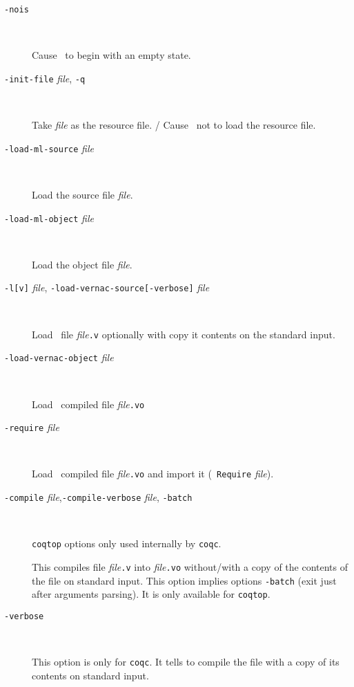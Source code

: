 \begin{description}
\item[{\tt -nois}]\ 

  Cause \Coq~to begin with an empty state.

\item[{\tt -init-file} {\em file}, {\tt -q}]\ 

  Take {\em file} as the resource file. /
  Cause \Coq~not to load the resource file.

\item[{\tt -load-ml-source} {\em file}]\ 

  Load the {\ocaml} source file {\em file}.

\item[{\tt -load-ml-object} {\em file}]\ 

  Load the {\ocaml} object file {\em file}.

\item[{\tt -l[v]} {\em file}, {\tt -load-vernac-source[-verbose]} {\em file}]\ 

  Load \Coq~file {\em file}{\tt .v} optionally with copy it contents on the
  standard input.

\item[{\tt -load-vernac-object} {\em file}]\ 

  Load \Coq~compiled file {\em file}{\tt .vo}

\item[{\tt -require} {\em file}]\ 

  Load \Coq~compiled file {\em file}{\tt .vo} and import it ({\tt
    Require} {\em file}).

\item[{\tt -compile} {\em file},{\tt -compile-verbose} {\em file}, {\tt -batch}]\ 

  {\tt coqtop} options only used internally by {\tt coqc}.

  This compiles file {\em file}{\tt .v} into {\em file}{\tt .vo} without/with a
  copy of the contents of the file on standard input.  This option implies options
  {\tt -batch} (exit just after arguments parsing). It is only
  available for {\tt coqtop}.

\item[{\tt -verbose}]\ 

  This option is only for {\tt coqc}. It tells to compile the file with
  a copy of its contents on standard input.

%


\end{description}
